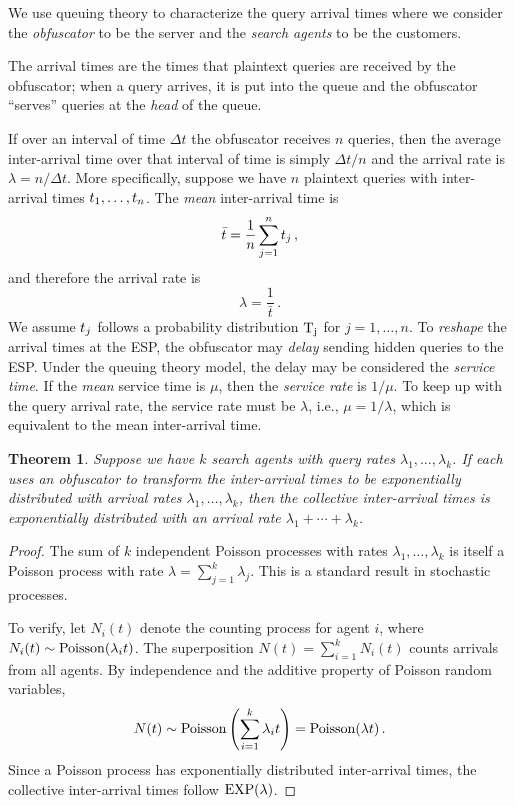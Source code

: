 \documentclass[final,11pt]{article}
\newcommand{\ts}[1][]{%
   \ifthenelse{ \equal{#1}{} }
      {\ensuremath{t}}
      {\ensuremath{t_{#1}}}
}
\newcommand{\rvts}[1][]{%
   \ifthenelse{ \equal{#1}{} }
      {\ensuremath{\rv{T}}}
      {\ensuremath{\rv{T_{#1}}}}
}
\newcommand{\rv}[1]{\mathrm{#1}}
\newcommand{\expdist}{\operatorname{\rm{EXP}}}
\newcommand{\poissondist}{\operatorname{\rm{Poisson}}}
\numberwithin{equation}{section}
\theoremstyle{plain}
\newtheorem{theorem}{Theorem}[section]
\theoremstyle{remark}
\begin{document}
We use queuing theory to characterize the query arrival times where we consider the \emph{obfuscator} to be the server and the \emph{search agents} to be the customers.

The arrival times are the times that plaintext queries are received by the obfuscator; when a query arrives, it is put into the queue and the obfuscator ``serves'' queries at the \emph{head} of the queue.

If over an interval of time $\Delta t$ the obfuscator receives $n$ queries, then the average inter-arrival time over that interval of time is simply $\Delta t / n$ and the arrival rate is $\lambda = n / \Delta t$. More specifically, suppose we have $n$ plaintext queries with inter-arrival times $\ts[1],\ldots,\ts[n]$. The \emph{mean} inter-arrival time is
\begin{equation}
    \bar{t} = \frac{1}{n} \sum_{j=1}^{n} \ts[j]\,,
\end{equation}
and therefore the arrival rate is
\begin{equation}
    \lambda = \frac{1}{\bar{t}}\,.
\end{equation}
We assume $\ts[j]$ follows a probability distribution $\rvts[j]$ for $j=1,\ldots,n$. To \emph{reshape} the arrival times at the ESP, the obfuscator may \emph{delay} sending hidden queries to the ESP. Under the queuing theory model, the delay may be considered the \emph{service time}. If the \emph{mean} service time is $\mu$, then the \emph{service rate} is $1 / \mu$. To keep up with the query arrival rate, the service rate must be $\lambda$, i.e., $\mu = 1 / \lambda$, which is equivalent to the mean inter-arrival time.

\begin{theorem}
Suppose we have $k$ search agents with query rates $\lambda_1, \ldots, \lambda_k$. If each uses an obfuscator to transform the inter-arrival times to be exponentially distributed with arrival rates $\lambda_1, \ldots, \lambda_k$, then the collective inter-arrival times is exponentially distributed with an arrival rate $\lambda_1 + \cdots + \lambda_k$.
\end{theorem}
\begin{proof}
The sum of $k$ independent Poisson processes with rates $\lambda_1, \ldots, \lambda_k$ is itself a Poisson process with rate $\lambda = \sum_{j=1}^{k} \lambda_j$. This is a standard result in stochastic processes.

To verify, let $N_i(t)$ denote the counting process for agent $i$, where $N_i(t) \sim \poissondist(\lambda_i t)$. The superposition $N(t) = \sum_{i=1}^{k} N_i(t)$ counts arrivals from all agents. By independence and the additive property of Poisson random variables,
\begin{equation}
    N(t) \sim \poissondist\left(\sum_{i=1}^{k} \lambda_i t\right) = \poissondist(\lambda t)\,.
\end{equation}
Since a Poisson process has exponentially distributed inter-arrival times, the collective inter-arrival times follow $\expdist(\lambda)$.
\end{proof}
\end{document}
